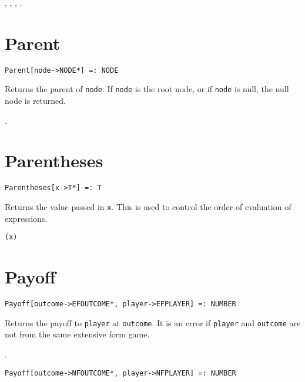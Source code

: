 \seealso {}, ,
, .


\section*{Parent}\label{PrimParent}
\begin{verbatim}
Parent[node->NODE*] =: NODE 
\end{verbatim}

\noindent
Returns the parent of \verb+node+.  If \verb+node+ is the root node,
or if \verb+node+ is null, the null node is returned.

\seealso {}.


\section*{Parentheses}\label{PrimParentheses}
\begin{verbatim}
Parentheses[x->T*] =: T 
\end{verbatim}
\foralltypes

\noindent
Returns the value passed in \verb+x+.  This is used to control
the order of evaluation of expressions.

\shortform \verb+(x)+


\section*{Payoff}\label{PrimPayoff}
\begin{verbatim}
Payoff[outcome->EFOUTCOME*, player->EFPLAYER] =: NUMBER 
\end{verbatim}

\noindent
Returns the payoff to \verb+player+ at \verb+outcome+.  It is an error if
\verb+player+ and \verb+outcome+ are not from the same extensive form game.

\seealso {}.

\newsignature

\begin{verbatim}
Payoff[outcome->NFOUTCOME*, player->NFPLAYER] =: NUMBER 
\end{verbatim}

